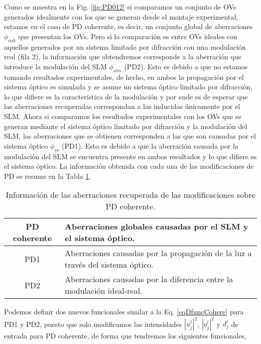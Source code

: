 Como se muestra en la Fig. \ref{fig:PD012} si comparamos un conjunto de OVs generados idealmente con los que se generan desde el montaje experimental, estamos en el caso de PD coherente, es decir, un conjunto global de aberraciones $\phi_{coh}$ que presentan los OVs. Pero si la comparación es entre OVs ideales con aquellos generados por un sistema limitado por difracción con una modulación real (fila 2), la información que obtendremos corresponde a la aberración que introduce la modulación del SLM $\phi_{slm}$ (PD2). Esto es debido a que no estamos tomando resultados experimentales, de hecho, en ambos la propagación por el sistema óptico es simulada y se asume un sistema óptico limitado por difracción, lo que difiere es la característica de la modulación y por ende es de esperar que las aberraciones recuperadas correspondan a las inducidas únicamente por el SLM. Ahora si comparamos los resultados experimentales con los OVs que se generan mediante el sistema óptico limitado por difracción y la modulación del SLM, las aberraciones que se obtienen corresponden a las que son causadas por el sistema óptico $\phi_{so}$ (PD1). Esto es debido a que la aberración causada por la modulación del SLM se encuentra presente en ambos resultados y lo que difiere es el sistema óptico. La información obtenida con cada una de las modificaciones de PD se resume en la Tabla \ref{tab:pd012}.

\begin{center}
\begin{table}
	\centering
	\begin{tabular}{|c|p{8cm}|}
	\hline 
	PD coherente & Aberraciones globales 
	causadas por el SLM y el sistema óptico. \\ 
	\hline 
	PD1 & Aberraciones causadas por la 
	propagación de la luz a través del sistema óptico. \\ 
	\hline 
	PD2 & Aberraciones causadas por la 
	diferencia entre la modulación ideal-real. \\ 
	\hline 
	\end{tabular} 
	\caption{Información de las aberraciones recuperada de las modificaciones sobre PD coherente.}
	\label{tab:pd012}
\end{table}
\end{center}

Podemos definir dos nuevos funcionales similar a la Eq. \ref{eqDfuncCohere} para PD1 y PD2, puesto que solo modificamos las intensidades $|u_{j}^{l}|^2$, $|o_{j}^l|^2$ y $d_{j}^l$ de entrada para PD coherente, de forma que tendremos los siguientes funcionales,

